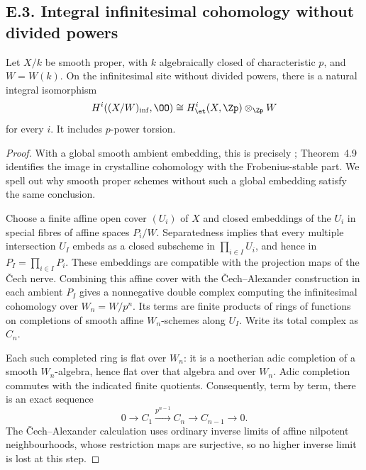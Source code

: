 \subsection{E.3. Integral infinitesimal cohomology without divided powers}

\begin{theorem}\label{thm:DE-inf}
Let $X/k$ be smooth proper, with $k$ algebraically closed of characteristic $p$, and $W=W(k)$.  On the infinitesimal site without divided powers, there is a natural integral isomorphism
\[
 H^i((X/W)_{\mathrm{inf}},\OO)
   \cong H^i_{\et}(X,\Zp)\otimes_{\Zp}W
\]
for every $i$.  It includes $p$-power torsion.
\end{theorem}
\begin{proof}
With a global smooth ambient embedding, this is precisely \cite[Corollaries~4.7 and~4.11, Remark~4.10]{Ogus1975}; Theorem~4.9 identifies the image in crystalline cohomology with the Frobenius-stable part.  We spell out why smooth proper schemes without such a global embedding satisfy the same conclusion.

Choose a finite affine open cover $(U_i)$ of $X$ and closed embeddings of the $U_i$ in special fibres of affine spaces $P_i/W$.  Separatedness implies that every multiple intersection $U_I$ embeds as a closed subscheme in $\prod_{i\in I}U_i$, and hence in $P_I=\prod_{i\in I}P_i$.  These embeddings are compatible with the projection maps of the \v Cech nerve.  Combining this affine cover with the \v Cech--Alexander construction in each ambient $P_I$ gives a nonnegative double complex computing the infinitesimal cohomology over $W_n=W/p^n$.  Its terms are finite products of rings of functions on completions of smooth affine $W_n$-schemes along $U_I$.  Write its total complex as $C_n$.

Each such completed ring is flat over $W_n$: it is a noetherian adic completion of a smooth $W_n$-algebra, hence flat over that algebra and over $W_n$.  Adic completion commutes with the indicated finite quotients.  Consequently, term by term, there is an exact sequence
\[
 0\longrightarrow C_1\xrightarrow{p^{n-1}}C_n\longrightarrow C_{n-1}\longrightarrow0.\tag{E.3.1}
\]
The \v Cech--Alexander calculation uses ordinary inverse limits of affine nilpotent neighbourhoods, whose restriction maps are surjective, so no higher inverse limit is lost at this step.


\end{proof}

